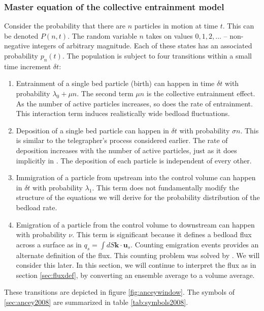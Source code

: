 \subsubsection{Master equation of the collective entrainment model} 

Consider the probability that there are $n$ particles in motion at time $t$. 
This can be denoted $P(n,t)$. 
The random variable $n$ takes on values $0,1,2,\dots$ -- non-negative integers of arbitrary magnitude. 
Each of these states has an associated probability $p_n(t)$.  
The population is subject to four transitions within a small time increment $\delta t$: 
\begin{enumerate}
\item 
Entrainment of a single bed particle (birth) can happen in time $\delta t$ with probability $\lambda_0 + \mu n$. 
The second term $\mu n$ is the collective entrainment effect. 
As the number of active particles increases, so does the rate of entrainment. 
This interaction term induces realistically wide bedload fluctuations. 
\item 
Deposition of a single bed particle can happen in $\delta t$ with probability $\sigma n$. 
This is similar to the telegrapher's process considered earlier. The rate of deposition increases with the number of active particles, just as it does implicitly in \citet{Ancey2006}. 
The deposition of each particle is independent of every other.  
\item 
Immigration of a particle from upstream into the control volume can happen in $\delta t$ with probability $\lambda_1$. 
This term does not fundamentally modify the structure of the equations we will derive for the probability distribution of the bedload rate. 
\item 
Emigration of a particle from the control volume to downstream can happen with probability $\nu$. 
This term is significant because it defines a bedload flux across a surface as in $q_s = \int dS \textbf{k} \cdot \textbf{u}_s$. 
Counting emigration events provides an alternate definition of the flux. 
This counting problem was solved by \citet{Ma2014}. 
We will consider this later. 
In this section, we will continue to interpret the flux as in section \ref{sec:fluxdef}, by converting an ensemble average to a volume average.
\end{enumerate} 
These transitions are depicted in figure \ref{fig:anceywindow}. 
The symbols of \ref{sec:ancey2008} are summarized in table \ref{tab:symbols2008}. 

